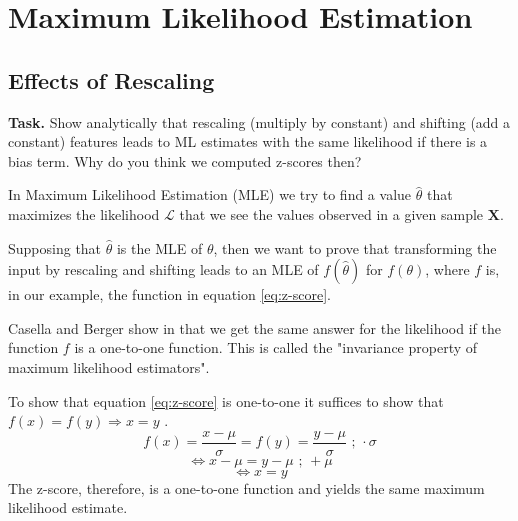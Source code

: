 \documentclass{support/acm_proc_article-sp}
\begin{document}

    \section{Maximum Likelihood Estimation}
    \vspace{1.5\baselineskip}


    \subsection{Effects of Rescaling}
    \label{sec:rescaling}
    \vspace{\baselineskip}

    \textbf{Task.} Show analytically that rescaling (multiply by constant) and shifting (add a constant) features leads
    to ML estimates with the same likelihood if there is a bias term.
    Why do you think we computed z-scores then?

    In Maximum Likelihood Estimation (MLE) we try to find a value $\hat{\theta}$ that maximizes the likelihood $\mathcal{L}$
    that we see the values observed in a given sample $\mathbf{X}$\cite[p.316]{CaseBerg:01}.

    Supposing that $\hat{\theta}$ is the MLE of $\theta$, then we want to prove that transforming the input by rescaling and
    shifting leads to an MLE of $f(\hat{\theta})$ for $f(\theta)$, where $f$ is, in our example, the function in equation \ref{eq:z-score}.

    Casella and Berger show in that we get the same answer for the likelihood if the function $f$ is a one-to-one function.
    This is called the "invariance property of maximum likelihood estimators". \cite[p.319]{CaseBerg:01}

    To show that equation \ref{eq:z-score} is one-to-one it suffices to show that $f(x) = f(y) \Rightarrow x = y$ \cite{101978}.
    \begin{equation*}
        f(x) = \frac{x - \mu}{\sigma} = f(y) = \frac{y - \mu}{\sigma} \mbox{  ;    } \cdot \sigma
    \end{equation*}
    \begin{equation*}
        \Leftrightarrow x - \mu = y - \mu \mbox{  ;    } + \mu
    \end{equation*}
    \begin{equation*}
        \Leftrightarrow x = y
    \end{equation*}
    The z-score, therefore, is a one-to-one function and yields the same maximum likelihood estimate.
\end{document}
